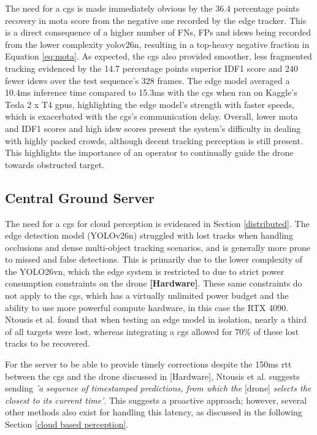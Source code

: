\documentclass{report_template_oxford}
\begin{document}
The need for a \gls{cgs} is made immediately obvious by the 36.4 percentage points recovery in \gls{mota} score from the negative one recorded by the edge tracker. This is a direct consequence of a higher number of FNs, FPs and \glspl{idsw} being recorded from the lower complexity \gls{yolo}v26n, resulting in a top-heavy negative fraction in Equation \ref{eq:mota}. As expected, the \gls{cgs} also provided smoother, less fragmented tracking evidenced by the 14.7 percentage points superior IDF1 score and 240 fewer \glspl{idsw} over the test sequence's 328 frames. The edge model averaged a 10.4ms inference time compared to 15.3ms with the \gls{cgs} when ran on Kaggle's Tesla 2 x T4 \glspl{gpu}, highlighting the edge model's strength with faster speeds, which is exacerbated with the \gls{cgs}'s communication delay. Overall, lower \gls{mota} and IDF1 scores and high \gls{idsw} scores present the system's difficulty in dealing with highly packed crowds, although decent tracking perception is still present. This highlights the importance of an operator to continually guide the drone towards obstructed target. 

\subsection{Central Ground Server}
The need for a \gls{cgs} for cloud perception is evidenced in Section \ref{distributed}. The edge detection model (YOLOv26n) struggled with lost tracks when handling occlusions and dense multi-object tracking scenarios, and is generally more prone to missed and false detections. This is primarily due to the lower complexity of the YOLO26vn, which the edge system is restricted to due to strict power consumption constraints on the drone \textbf{[Hardware]}. These same constraints do not apply to the \gls{cgs}, which has a virtually unlimited power budget and  the ability to use more powerful compute hardware, in this case the RTX 4090. Ntousis et al. \cite{ntousis} found that when testing an edge model in isolation, nearly a third of all targets were lost, whereas integrating a \gls{cgs} allowed for 70\% of these lost tracks to be recovered. 

For the server to be able to provide timely corrections despite the 150ms \gls{rtt} between the \gls{cgs} and the drone discussed in [Hardware], Ntousis et al. \cite{ntousis} suggests sending \textit{'a sequence of timestamped predictions, from which the} [drone] \textit{selects the closest to its current time'}. This suggests a proactive approach; however, several other methods also exist for handling this latency, as discussed in the following Section \ref{cloud based perception}. 
\end{document}
